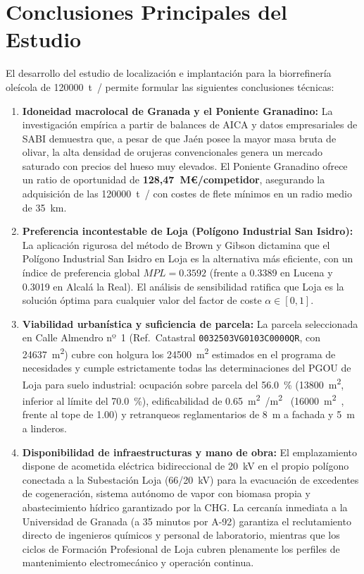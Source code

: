 \documentclass{report}
\begin{document}
\section{Conclusiones Principales del Estudio}
El desarrollo del estudio de localización e implantación para la biorrefinería oleícola de \SI{120000}{\tonne{}/} permite formular las siguientes conclusiones técnicas:
\begin{enumerate}
    \item \textbf{Idoneidad macrolocal de Granada y el Poniente Granadino:} La investigación empírica a partir de balances de AICA y datos empresariales de SABI demuestra que, a pesar de que Jaén posee la mayor masa bruta de olivar, la alta densidad de orujeras convencionales genera un mercado saturado con precios del hueso muy elevados. El Poniente Granadino ofrece un ratio de oportunidad de \textbf{128,47~M€/competidor}, asegurando la adquisición de las \SI{120000}{\tonne{}/} con costes de flete mínimos en un radio medio de \SI{35}{\kilo\metre}.
    \item \textbf{Preferencia incontestable de Loja (Polígono Industrial San Isidro):} La aplicación rigurosa del método de Brown y Gibson dictamina que el Polígono Industrial San Isidro en Loja es la alternativa más eficiente, con un índice de preferencia global $MPL = \num{0.3592}$ (frente a \num{0.3389} en Lucena y \num{0.3019} en Alcalá la Real). El análisis de sensibilidad ratifica que Loja es la solución óptima para cualquier valor del factor de coste $\alpha \in [0, 1]$.
    \item \textbf{Viabilidad urbanística y suficiencia de parcela:} La parcela seleccionada en Calle Almendro nº~1 (Ref.~Catastral \texttt{0032503VG0103C0000QR}, con \SI{24637}{\square\metre}) cubre con holgura los \SI{24500}{\square\metre} estimados en el programa de necesidades y cumple estrictamente todas las determinaciones del PGOU de Loja para suelo industrial: ocupación sobre parcela del \SI{56.0}{\percent} (\SI{13800}{\square\metre}, inferior al límite del \SI{70.0}{\percent}), edificabilidad de \SI{0.65}{\square\metre{}/\square\metre{}} (\SI{16000}{\square\metre{}}, frente al tope de \num{1.00}) y retranqueos reglamentarios de \SI{8}{\metre} a fachada y \SI{5}{\metre} a linderos.
    \item \textbf{Disponibilidad de infraestructuras y mano de obra:} El emplazamiento dispone de acometida eléctrica bidireccional de 20~kV en el propio polígono conectada a la Subestación Loja (66/20~kV) para la evacuación de excedentes de cogeneración, sistema autónomo de vapor con biomasa propia y abastecimiento hídrico garantizado por la CHG. La cercanía inmediata a la Universidad de Granada (a 35 minutos por A-92) garantiza el reclutamiento directo de ingenieros químicos y personal de laboratorio, mientras que los ciclos de Formación Profesional de Loja cubren plenamente los perfiles de mantenimiento electromecánico y operación continua.

\end{enumerate}
\end{document}
